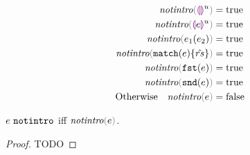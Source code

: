 \begin{subequations}\label{defn:notintro}
  \begin{align}
    \fnotIntro{\hehole{u}} ={}& \true \label{defn:ehole-notintro}\\
    \fnotIntro{\hhole{e}{u}} ={}& \true \label{defn:hole-notintro}\\
    \fnotIntro{\hap{e_1}{e_2}} ={}& \true \label{defn:ap-notintro}\\
    \fnotIntro{\hmatch{e}{\zrules}} ={}& \true \label{defn:match-notintro}\\
    \fnotIntro{\hfst{e}} ={}& \true \label{defn:fst-notintro}\\
    \fnotIntro{\hsnd{e}} ={}& \true \label{defn:snd-notintro}\\
    \text{Otherwise}\quad \fnotIntro{e} ={}& \false \label{defn:not-notintro}
  \end{align}
\end{subequations}

\begin{lemma}
  \label{lem:sound-complete-notintro}
  $e ~\mathtt{notintro}$ iff $\fnotIntro{e}$.
\end{lemma}
\begin{proof}
  TODO
\end{proof}

